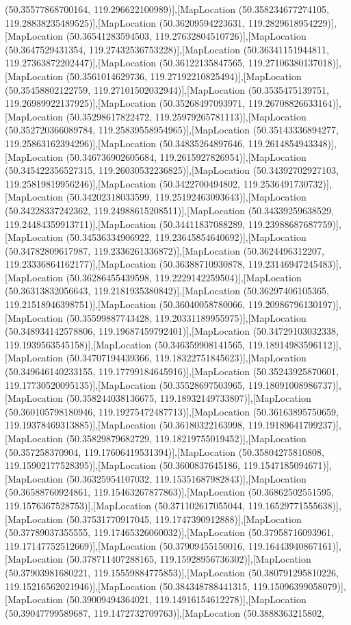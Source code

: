 (50.35577868700164, 119.296622100989)],[MapLocation (50.358234677274105, 119.28838235489525)],[MapLocation (50.36209594223631, 119.2829618954229)],[MapLocation (50.36541283594503, 119.27632804510726)],[MapLocation (50.3647529431354, 119.27432536753228)],[MapLocation (50.36341151944811, 119.27363872202447)],[MapLocation (50.36122135847565, 119.27106380137018)],[MapLocation (50.3561014629736, 119.27192210825494)],[MapLocation (50.35458802122759, 119.27101502032944)],[MapLocation (50.3535475139751, 119.26989922137925)],[MapLocation (50.35268497093971, 119.26708826633164)],[MapLocation (50.35298617822472, 119.25979265781113)],[MapLocation (50.352720366089784, 119.25839558954965)],[MapLocation (50.35143336894277, 119.25863162394296)],[MapLocation (50.34835264897646, 119.2614854943348)],[MapLocation (50.346736902605684, 119.2615927826954)],[MapLocation (50.345422356527315, 119.26030532236825)],[MapLocation (50.34392702927103, 119.25819819956246)],[MapLocation (50.3422700494802, 119.2536491730732)],[MapLocation (50.34202318033599, 119.25192463093643)],[MapLocation (50.34228337242362, 119.24988615208511)],[MapLocation (50.34339259638529, 119.24484359913711)],[MapLocation (50.34411837088289, 119.23988687687759)],[MapLocation (50.34536334906922, 119.23645854640692)],[MapLocation (50.34782809617987, 119.2336261336872)],[MapLocation (50.3624496312207, 119.23336864162177)],[MapLocation (50.36388710930878, 119.23146947245483)],[MapLocation (50.36286455439598, 119.2229142259504)],[MapLocation (50.36313832056643, 119.2181935380842)],[MapLocation (50.36297406105365, 119.21518946398751)],[MapLocation (50.36040058780066, 119.20986796130197)],[MapLocation (50.35599887743428, 119.20331189955975)],[MapLocation (50.348934142578806, 119.19687459792401)],[MapLocation (50.34729103032338, 119.1939563545158)],[MapLocation (50.346359908141565, 119.18914983596112)],[MapLocation (50.34707194439366, 119.18322751845623)],[MapLocation (50.349646140233155, 119.17799184645916)],[MapLocation (50.35243925870601, 119.17730520095135)],[MapLocation (50.35528697503965, 119.18091008986737)],[MapLocation (50.358244038136675, 119.18932149733807)],[MapLocation (50.360105798180946, 119.19275472487713)],[MapLocation (50.36163895750659, 119.19378469313885)],[MapLocation (50.36180322163998, 119.19189641799237)],[MapLocation (50.35829879682729, 119.18219755019452)],[MapLocation (50.357258370904, 119.17606419531394)],[MapLocation (50.35804275810808, 119.15902177528395)],[MapLocation (50.3600837645186, 119.1547185094671)],[MapLocation (50.36325954107032, 119.15351687982843)],[MapLocation (50.36588760924861, 119.15463267877863)],[MapLocation (50.36862502551595, 119.1576367528753)],[MapLocation (50.371102617055044, 119.16529771555638)],[MapLocation (50.37531770917045, 119.1747390912888)],[MapLocation (50.37789037355555, 119.17465326060032)],[MapLocation (50.37958716093961, 119.17147752512669)],[MapLocation (50.37909455150016, 119.16443940867161)],[MapLocation (50.378711407288165, 119.15928956736302)],[MapLocation (50.37903981680221, 119.15559884775853)],[MapLocation (50.380791295810226, 119.15216562021946)],[MapLocation (50.384348788441315, 119.15096399058079)],[MapLocation (50.39009494364021, 119.14916154612278)],[MapLocation (50.39047799589687, 119.1472732709763)],[MapLocation (50.3888363215802, 